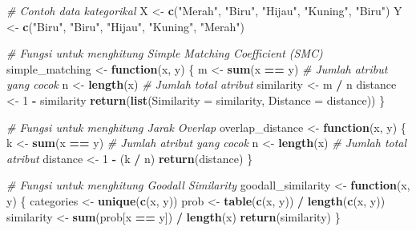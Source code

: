 \documentclass[
  oneside]{book}
\newenvironment{Shaded}{\begin{snugshade}}{\end{snugshade}}
\newcommand{\AttributeTok}[1]{\textcolor[rgb]{0.13,0.29,0.53}{#1}}
\newcommand{\CommentTok}[1]{\textcolor[rgb]{0.56,0.35,0.01}{\textit{#1}}}
\newcommand{\ControlFlowTok}[1]{\textcolor[rgb]{0.13,0.29,0.53}{\textbf{#1}}}
\newcommand{\DecValTok}[1]{\textcolor[rgb]{0.00,0.00,0.81}{#1}}
\newcommand{\FunctionTok}[1]{\textcolor[rgb]{0.13,0.29,0.53}{\textbf{#1}}}
\newcommand{\NormalTok}[1]{#1}
\newcommand{\OtherTok}[1]{\textcolor[rgb]{0.56,0.35,0.01}{#1}}
\newcommand{\SpecialCharTok}[1]{\textcolor[rgb]{0.81,0.36,0.00}{\textbf{#1}}}
\newcommand{\StringTok}[1]{\textcolor[rgb]{0.31,0.60,0.02}{#1}}
\begin{document}
\begin{Shaded}
\begin{Highlighting}[]
\CommentTok{\# Contoh data kategorikal}
\NormalTok{X }\OtherTok{\textless{}{-}} \FunctionTok{c}\NormalTok{(}\StringTok{"Merah"}\NormalTok{, }\StringTok{"Biru"}\NormalTok{, }\StringTok{"Hijau"}\NormalTok{, }\StringTok{"Kuning"}\NormalTok{, }\StringTok{"Biru"}\NormalTok{)}
\NormalTok{Y }\OtherTok{\textless{}{-}} \FunctionTok{c}\NormalTok{(}\StringTok{"Biru"}\NormalTok{, }\StringTok{"Biru"}\NormalTok{, }\StringTok{"Hijau"}\NormalTok{, }\StringTok{"Kuning"}\NormalTok{, }\StringTok{"Merah"}\NormalTok{)}

\CommentTok{\# Fungsi untuk menghitung Simple Matching Coefficient (SMC)}
\NormalTok{simple\_matching }\OtherTok{\textless{}{-}} \ControlFlowTok{function}\NormalTok{(x, y) \{}
\NormalTok{  m }\OtherTok{\textless{}{-}} \FunctionTok{sum}\NormalTok{(x }\SpecialCharTok{==}\NormalTok{ y) }\CommentTok{\# Jumlah atribut yang cocok}
\NormalTok{  n }\OtherTok{\textless{}{-}} \FunctionTok{length}\NormalTok{(x)   }\CommentTok{\# Jumlah total atribut}
\NormalTok{  similarity }\OtherTok{\textless{}{-}}\NormalTok{ m }\SpecialCharTok{/}\NormalTok{ n}
\NormalTok{  distance }\OtherTok{\textless{}{-}} \DecValTok{1} \SpecialCharTok{{-}}\NormalTok{ similarity}
  \FunctionTok{return}\NormalTok{(}\FunctionTok{list}\NormalTok{(}\AttributeTok{Similarity =}\NormalTok{ similarity, }\AttributeTok{Distance =}\NormalTok{ distance))}
\NormalTok{\}}

\CommentTok{\# Fungsi untuk menghitung Jarak Overlap}
\NormalTok{overlap\_distance }\OtherTok{\textless{}{-}} \ControlFlowTok{function}\NormalTok{(x, y) \{}
\NormalTok{  k }\OtherTok{\textless{}{-}} \FunctionTok{sum}\NormalTok{(x }\SpecialCharTok{==}\NormalTok{ y) }\CommentTok{\# Jumlah atribut yang cocok}
\NormalTok{  n }\OtherTok{\textless{}{-}} \FunctionTok{length}\NormalTok{(x)   }\CommentTok{\# Jumlah total atribut}
\NormalTok{  distance }\OtherTok{\textless{}{-}} \DecValTok{1} \SpecialCharTok{{-}}\NormalTok{ (k }\SpecialCharTok{/}\NormalTok{ n)}
  \FunctionTok{return}\NormalTok{(distance)}
\NormalTok{\}}

\CommentTok{\# Fungsi untuk menghitung Goodall Similarity}
\NormalTok{goodall\_similarity }\OtherTok{\textless{}{-}} \ControlFlowTok{function}\NormalTok{(x, y) \{}
\NormalTok{  categories }\OtherTok{\textless{}{-}} \FunctionTok{unique}\NormalTok{(}\FunctionTok{c}\NormalTok{(x, y))}
\NormalTok{  prob }\OtherTok{\textless{}{-}} \FunctionTok{table}\NormalTok{(}\FunctionTok{c}\NormalTok{(x, y)) }\SpecialCharTok{/} \FunctionTok{length}\NormalTok{(}\FunctionTok{c}\NormalTok{(x, y))}
\NormalTok{  similarity }\OtherTok{\textless{}{-}} \FunctionTok{sum}\NormalTok{(prob[x }\SpecialCharTok{==}\NormalTok{ y]) }\SpecialCharTok{/} \FunctionTok{length}\NormalTok{(x)}
  \FunctionTok{return}\NormalTok{(similarity)}
\NormalTok{\}}


\end{Highlighting}
\end{Shaded}
\end{document}
